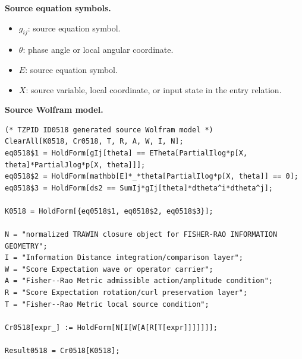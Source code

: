 \begin{minipage}[t]{0.49\linewidth}
\begingroup
\small
\raggedright
\textbf{Source equation symbols.}\par
\begin{itemize}[leftmargin=1.35em,itemsep=1pt,topsep=1pt,parsep=0pt]
    \item $g_{ij}$: source equation symbol.
    \item $\theta$: phase angle or local angular coordinate.
    \item $E$: source equation symbol.
    \item $X$: source variable, local coordinate, or input state in the entry relation.
\end{itemize}
\endgroup
\end{minipage}\hfill
\begin{minipage}[t]{0.47\linewidth}
\begingroup
\scriptsize
\raggedright
\textbf{Source Wolfram model.}\par
\begin{Verbatim}[fontsize=\tiny,breaklines=true,breakanywhere=true]
(* TZPID ID0518 generated source Wolfram model *)
ClearAll[K0518, Cr0518, T, R, A, W, I, N];
eq0518$1 = HoldForm[gIj[theta] == ETheta[PartialIlog*p[X, theta]*PartialJlog*p[X, theta]]];
eq0518$2 = HoldForm[mathbb[E]*_*theta[PartialIlog*p[X, theta]] == 0];
eq0518$3 = HoldForm[ds2 == SumIj*gIj[theta]*dtheta^i*dtheta^j];

K0518 = HoldForm[{eq0518$1, eq0518$2, eq0518$3}];

N = "normalized TRAWIN closure object for FISHER-RAO INFORMATION GEOMETRY";
I = "Information Distance integration/comparison layer";
W = "Score Expectation wave or operator carrier";
A = "Fisher--Rao Metric admissible action/amplitude condition";
R = "Score Expectation rotation/curl preservation layer";
T = "Fisher--Rao Metric local source condition";

Cr0518[expr_] := HoldForm[N[I[W[A[R[T[expr]]]]]]];

Result0518 = Cr0518[K0518];
\end{Verbatim}
\endgroup
\end{minipage}

